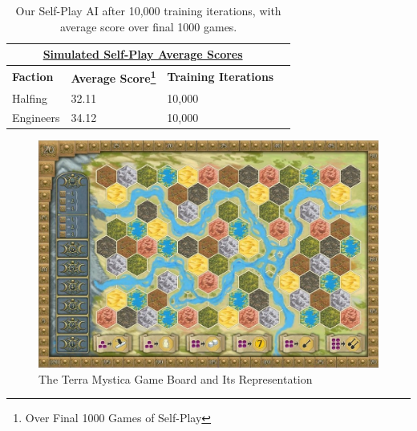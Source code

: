 \documentclass[8pt,twocolumn]{article}
\begin{document}
\begin{table}[h!]
\begin{tabular}{|l|l|l|l|}
\hline
\multicolumn{3}{|c|}{{\ul \textbf{Simulated Self-Play Average Scores}}}      \\ \hline
\textbf{Faction} & \textbf{Average Score\footnote{Over Final 1000 Games of Self-Play}} & \textbf{Training Iterations} \\ \hline
Halfing          & 32.11                 & 10,000                   \\ \hline
Engineers        & 34.12                 & 10,000                 \\ \hline
\end{tabular}
\caption{Our Self-Play AI after 10,000 training iterations, with average score over final 1000 games.}
\label{table:average_2p_score_our_ai}
\end{table}


\begin{figure}[h!]
    \centering
    \includegraphics[scale=0.2]{../figures/tm_board}
    \caption{The Terra Mystica Game Board and Its Representation}
    \label{fig:TM_Board}
\end{figure}
\end{document}
